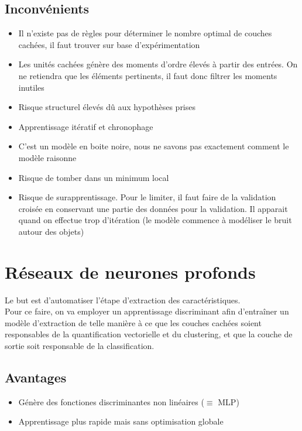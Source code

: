 \documentclass[a4paper,12pt,oneside]{report}	%
\begin{document}
        \subsection*{Inconvénients}
            \begin{itemize}
                \item Il n'existe pas de règles pour déterminer le nombre optimal de couches cachées, il faut trouver sur base d'expérimentation
                \item Les unités cachées génère des moments d'ordre élevés à partir des entrées. On ne retiendra que les éléments pertinents, il faut donc filtrer les moments inutiles
                \item Risque structurel élevés dû aux hypothèses prises
                \item Apprentissage itératif et \colorbox{bright-red}{chronophage}
                \item C'est un modèle en boite noire, nous ne savons pas exactement comment le modèle raisonne
                \item Risque de tomber dans un minimum local
                \item Risque de surapprentissage. Pour le limiter, il faut faire de la validation croisée en conservant une partie des données pour la validation. Il apparait quand on effectue trop d'itération (le modèle commence à modéliser le bruit autour des objets)
            \end{itemize}
    \section{Réseaux de neurones profonds}
        \colorbox{bright-blue}{Le but est d'automatiser l'étape d'extraction des caractéristiques.}\\
        Pour ce faire, on va employer un apprentissage discriminant afin d'entraîner un modèle d'extraction de telle manière à ce que les couches cachées soient responsables de la quantification vectorielle et du clustering, et que la couche de sortie soit responsable de la classification. 
        \subsection*{Avantages}
            \begin{itemize}
                \item Génère des fonctiones discriminantes non linéaires ($\equiv$ MLP)
                \item Apprentissage plus rapide mais sans optimisation globale
            \end{itemize}
\end{document}
